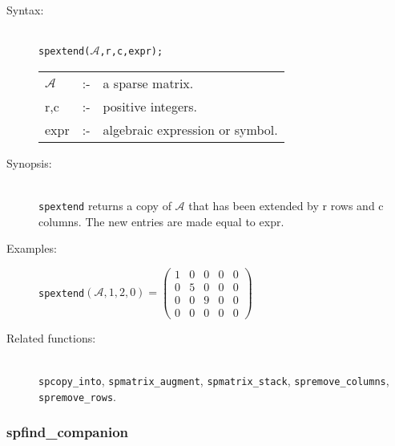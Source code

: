 \begin{description}
\item[Syntax:]\mbox{}\\
 \texttt{spextend($\mathcal{A}$,r,c,expr);}\\[2mm]
\begin{tabular}{l l l}
$\mathcal{A}$ &:-& a sparse matrix. \\
r,c        &:-& positive integers. \\
expr      &:-& algebraic expression or symbol.
\end{tabular}

\item[Synopsis:]\mbox{}\\
                \texttt{spextend} returns a copy of $\mathcal{A}$ that has been
                extended by r rows and c columns. The new entries are
                made equal to expr.

\item[Examples:]
\begin{flushleft}
\texttt{spextend}\((\mathcal{A},1,2,0) =
\begin{pmatrix} 1 & 0 & 0 & 0 & 0 \\ 0 & 5 & 0 & 0 & 0
\\ 0 & 0 & 9 & 0 & 0 \\ 0 & 0 & 0 & 0 & 0
\end{pmatrix}
\)
\end{flushleft}

\item[Related functions:]\mbox{}\\
\texttt{spcopy\_into}, \texttt{spmatrix\_augment},
\texttt{spmatrix\_stack}, \texttt{spremove\_columns}, \texttt{spremove\_rows}.

\end{description}


\subsubsection{spfind\_companion}
\label{sparse:spfind_companion}

